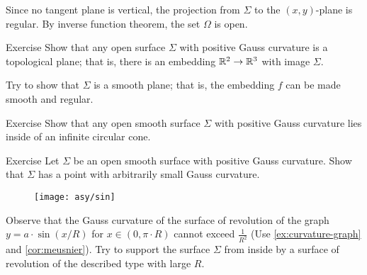 Since no tangent plane is vertical, the projection from $\Sigma$ to the $(x,y)$-plane is regular.
By inverse function theorem, the set $\Omega$ is open.\qeds

\begin{thm}{Exercise}
Show that any open surface $\Sigma$ with positive Gauss curvature is a topological plane;
that is, there is an embedding $\mathbb{R}^2\to\mathbb{R}^3$ with image $\Sigma$.

Try to show that $\Sigma$ is a smooth plane; that is, the embedding $f$ can be made smooth and regular.
\end{thm}

\begin{thm}{Exercise}\label{ex:circular-cone}
Show that any open smooth surface $\Sigma$ with positive Gauss curvature
lies inside of an infinite circular cone. 
\end{thm}

\begin{thm}{Exercise}\label{ex:small-gauss}
Let $\Sigma$ be an open smooth surface with positive Gauss curvature.
Show that $\Sigma$ has a point with arbitrarily small Gauss curvature.
\end{thm} %

\begin{figure}[h!]
\vskip-0mm
\centering
\texttt{[image: asy/sin]}
\vskip-0mm
\end{figure}

Observe that the Gauss curvature of the surface of revolution of the graph $y=a\cdot \sin (x/R)$ for $x\in(0,\pi\cdot R)$ cannot exceed $\tfrac{1}{R^2}$ (Use \ref{ex:curvature-graph} and \ref{cor:meusnier}).
Try to support the surface $\Sigma$ from inside by a surface of revolution of the described type with large $R$. 


 

